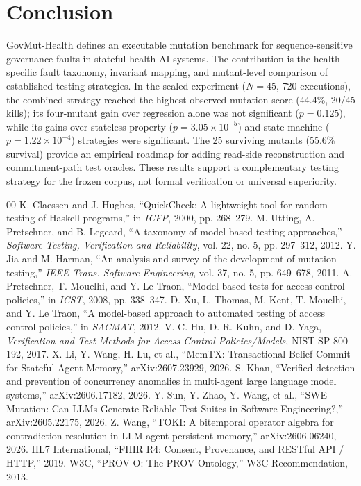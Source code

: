 \documentclass[conference]{IEEEtran}
\begin{document}
\section{Conclusion}
GovMut-Health defines an executable mutation benchmark for sequence-sensitive governance faults in stateful health-AI systems. The contribution is the health-specific fault taxonomy, invariant mapping, and mutant-level comparison of established testing strategies. In the sealed experiment ($N=45$, 720 executions), the combined strategy reached the highest observed mutation score (44.4\%, 20/45 kills); its four-mutant gain over regression alone was not significant ($p = 0.125$), while its gains over stateless-property ($p = 3.05 \times 10^{-5}$) and state-machine ($p = 1.22 \times 10^{-4}$) strategies were significant. The 25 surviving mutants (55.6\% survival) provide an empirical roadmap for adding read-side reconstruction and commitment-path test oracles. These results support a complementary testing strategy for the frozen corpus, not formal verification or universal superiority.
\begin{thebibliography}{00}
 K. Claessen and J. Hughes, ``QuickCheck: A lightweight tool for random testing of Haskell programs,'' in \emph{ICFP}, 2000, pp. 268--279.
 M. Utting, A. Pretschner, and B. Legeard, ``A taxonomy of model-based testing approaches,'' \emph{Software Testing, Verification and Reliability}, vol. 22, no. 5, pp. 297--312, 2012.
 Y. Jia and M. Harman, ``An analysis and survey of the development of mutation testing,'' \emph{IEEE Trans. Software Engineering}, vol. 37, no. 5, pp. 649--678, 2011.
 A. Pretschner, T. Mouelhi, and Y. Le Traon, ``Model-based tests for access control policies,'' in \emph{ICST}, 2008, pp. 338--347.
 D. Xu, L. Thomas, M. Kent, T. Mouelhi, and Y. Le Traon, ``A model-based approach to automated testing of access control policies,'' in \emph{SACMAT}, 2012.
 V. C. Hu, D. R. Kuhn, and D. Yaga, \emph{Verification and Test Methods for Access Control Policies/Models}, NIST SP 800-192, 2017.
 X. Li, Y. Wang, H. Lu, et al., ``MemTX: Transactional Belief Commit for Stateful Agent Memory,'' arXiv:2607.23929, 2026.
 S. Khan, ``Verified detection and prevention of concurrency anomalies in multi-agent large language model systems,'' arXiv:2606.17182, 2026.
 Y. Sun, Y. Zhao, Y. Wang, et al., ``SWE-Mutation: Can LLMs Generate Reliable Test Suites in Software Engineering?,'' arXiv:2605.22175, 2026.
 Z. Wang, ``TOKI: A bitemporal operator algebra for contradiction resolution in LLM-agent persistent memory,'' arXiv:2606.06240, 2026.
 HL7 International, ``FHIR R4: Consent, Provenance, and RESTful API / HTTP,'' 2019.
 W3C, ``PROV-O: The PROV Ontology,'' W3C Recommendation, 2013.
\end{thebibliography}
\end{document}
